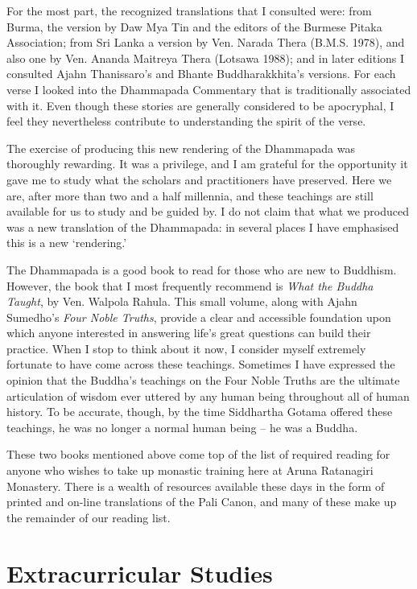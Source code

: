 For the most part, the recognized translations that I consulted were:
from Burma, the version by Daw Mya Tin and the editors of the
Burmese Pitaka Association\cite{burmese-pitaka}; from Sri Lanka a
version by Ven. Narada Thera (B.M.S. 1978), and also one by Ven. Ananda
Maitreya Thera (Lotsawa 1988); and in later editions I consulted
Ajahn Thanissaro's and Bhante Buddharakkhita's\cite{buddharakita} versions.
For each verse I looked into the Dhammapada Commentary\cite{commentary}
that is traditionally associated with it. Even
though these stories are generally considered to be apocryphal, I feel
they nevertheless contribute to understanding the spirit of the verse.

The exercise of producing this new rendering of the Dhammapada was
thoroughly rewarding. It was a privilege, and I am grateful for the
opportunity it gave me to study what the scholars and practitioners have
preserved. Here we are, after more than two and a half millennia, and
these teachings are still available for us to study and be guided by. I
do not claim that what we produced was a new translation of the
Dhammapada: in several places I have emphasised this is a new
`rendering.'

The Dhammapada is a good book to read for those who are new to Buddhism.
However, the book that I most frequently recommend is \emph{What the
  Buddha Taught}, by Ven. Walpola Rahula. This small volume,
along with Ajahn Sumedho's \emph{Four Noble Truths}\cite{truths}, provide a clear and accessible foundation
upon which anyone interested in answering life's great questions can
build their practice. When I stop to think about it now, I consider
myself extremely fortunate to have come across these teachings. Sometimes I have expressed the opinion that the Buddha's teachings on the Four
Noble Truths are the ultimate articulation of wisdom ever uttered by any
human being throughout all of human history. To be accurate, though, by
the time Siddhartha Gotama offered these teachings, he was no longer a
normal human being -- he was a Buddha.

These two books mentioned above come top of the list of required reading
for anyone who wishes to take up monastic training here at Aruna
Ratanagiri Monastery. There is a wealth of resources available these
days in the form of printed and on-line translations of the Pali Canon,
and many of these make up the remainder of our reading list.

\section{Extracurricular Studies}

